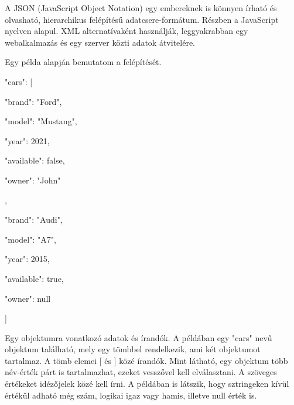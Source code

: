 A JSON (JavaScript Object Notation) egy embereknek is könnyen írható és olvasható, hierarchikus felépítésű adatcsere-formátum. Részben a JavaScript nyelven alapul. XML alternatívaként használják, leggyakrabban egy webalkalmazás és egy szerver közti adatok átvitelére. 

Egy példa alapján bemutatom a felépítését. 

{"cars": [{ 

"brand": "Ford", 

"model": "Mustang", 

"year": 2021, 

"available": false, 

"owner": "John" 

        }, { 

"brand": "Audi", 

"model": "A7", 

"year": 2015, 

"available": true, 

"owner": null 

        } 

]} 

Egy objektumra vonatkozó adatok { és } írandók. A példában egy "cars" nevű objektum található, mely egy tömbbel rendelkezik, ami két objektumot tartalmaz. A tömb elemei [ és ] közé írandók. Mint látható, egy objektum több név-érték párt is tartalmazhat, ezeket vesszővel kell elválasztani. A szöveges értékeket idézőjelek közé kell írni. A példában is látszik, hogy sztringeken kívül értékül adható még szám, logikai igaz vagy hamis, illetve null érték is. 